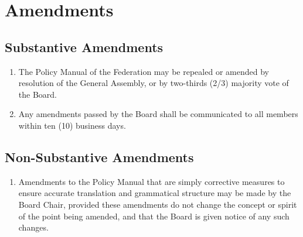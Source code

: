 \section{Amendments}
\label{amendments}

\subsection{Substantive Amendments}
\label{substantive-amendments}

\begin{enumerate}
 \item
  The Policy Manual of the Federation may be repealed or amended by resolution of the General Assembly, or by two-thirds (2/3) majority vote of the Board.
 \item
  Any amendments passed by the Board shall be communicated to all members within ten (10) business days.
\end{enumerate}

\subsection{Non-Substantive Amendments}
\label{non-substantive-amendments}

\begin{enumerate}
 \item
  Amendments to the Policy Manual that are simply corrective measures to ensure accurate translation and grammatical structure may be made by the Board Chair, provided these amendments do not change the concept or spirit of the point being amended, and that the Board is given notice of any such changes.
\end{enumerate}


